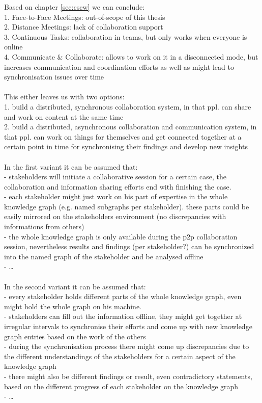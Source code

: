 Based on chapter \ref{sec:cscw} we can conclude: \\
1. Face-to-Face Meetings: out-of-scope of this thesis \\
2. Distance Meetings: lack of collaboration support \\
3. Continuous Tasks: collaboration in teams, but only works when everyone is online \\
4. Communicate \& Collaborate: allows to work on it in a disconnected mode, but increases
communication and coordination efforts as well as might lead to synchronisation issues over time \\
\\
This either leaves us with two options: \\
1. build a distributed, synchronous collaboration system, in that ppl. can share and work on content at the same time \\
2. build a distributed, asynchronous collaboration and communication system, in that ppl. can work on things for themselves and
get connected together at a certain point in time for synchronising their findings and develop new insights \\
\\
In the first variant it can be assumed that: \\
- stakeholders will initiate a collaborative session for a certain case, the collaboration and information sharing efforts end
with finishing the case. \\
- each stakeholder might just work on his part of expertise in the whole knowledge graph (e.g. named subgraphs per stakeholder).
these parts could be easily mirrored on the stakeholders environment (no discrepancies with informations from others) \\
- the whole knowledge graph is only available during the p2p collaboration session, nevertheless results and findings (per stakeholder?)
can be synchronized into the named graph of the stakeholder and be analysed offline \\
- \ldots \\
\\
In the second variant it can be assumed that: \\
- every stakeholder holds different parts of the whole knowledge graph, even might hold the whole graph on his machine. \\
- stakeholders can fill out the information offline, they might get together at irregular intervals to synchronise their efforts and
come up with new knowledge graph entries based on the work of the others \\
- during the synchronisation process there might come up discrepancies due to the different understandings of the stakeholders for a certain aspect of
the knowledge graph \\
- there might also be different findings or result, even contradictory statements, based on the different progress of each stakeholder on the knowledge graph \\
- \ldots \\
\\

